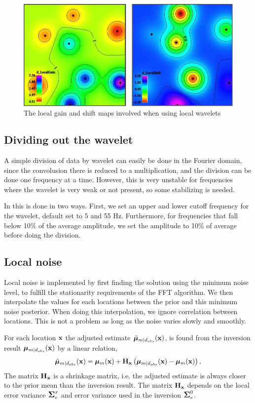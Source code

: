 \begin{figure}
  \includegraphics[width=.99\linewidth]{images/local-wavelet}
  \caption{The local gain and shift maps involved when using local wavelets}
  \label{fig:local-wavelet}
\end{figure}

\subsection{Dividing out the wavelet}
\label{sec:divwavimp}
A simple division of data by wavelet can easily be done in the Fourier domain, since the convolusion there is reduced to a multiplication, and the division can be done one frequency at a time. However, this is very unstable for frequencies where the wavelet is very weak or not present, so some stabilizing is needed.

In \crava this is done in two ways. First, we set an upper and lower cutoff frequency for the wavelet, default set to 5 and 55 Hz. Furthermore, for frequencies that fall below 10\% of the average amplitude, we set the amplitude to 10\% of average before doing the division.

\subsection{Local noise}
\label{sec:localnoiseimp}
Local noise is implemented by first finding the solution using the minimum noise level, to fulfill the stationarity requirements of the FFT algorithm. We then interpolate the values for each locations between the prior and this minimum noise posterior. When doing this interpolation, we ignore correlation between locations. This is not a problem as long as the noise varies slowly and smoothly.


For each location $\mathbf{x}$ the adjusted estimate $\tilde{\bm\mu}_{m|d_{obs}}(\mathbf{x})$, is found
from the inversion result $\bm\mu_{m|d_{obs}}(\mathbf{x})$ by a linear relation,
\begin{equation} \label{eq:LocalAdjustment}
\tilde{\bm\mu}_{m|d_{obs}}(\mathbf{x}) = \bm\mu_{m}(\mathbf{x}) +\mathbf{H_x}\left(\bm\mu_{m|d_{obs}}(\mathbf{x})-\bm\mu_{m}(\mathbf{x})\right),
\end{equation}
The matrix $\mathbf{H_x}$ is a shrinkage matrix, i.e. the adjusted estimate
is always closer to the prior mean than the inversion result. The matrix
$\mathbf{H_x}$ depends on the local error variance
 $\mbox{\large\ensuremath{\boldsymbol{\Sigma}}}_{e}^x$ and error variance used in the inversion $\mbox{\large\ensuremath{\boldsymbol{\Sigma}}}_{e}^0$.

